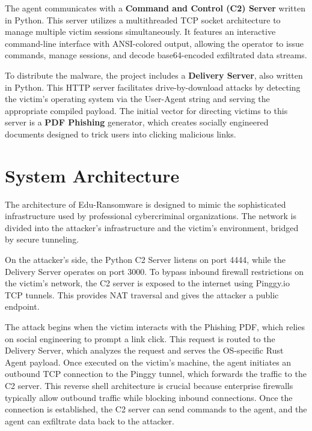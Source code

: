 \documentclass[12pt,a4paper]{article}
\begin{document}
The agent communicates with a \textbf{Command and Control (C2) Server} written in Python. This server utilizes a multithreaded TCP socket architecture to manage multiple victim sessions simultaneously. It features an interactive command-line interface with ANSI-colored output, allowing the operator to issue commands, manage sessions, and decode base64-encoded exfiltrated data streams.

To distribute the malware, the project includes a \textbf{Delivery Server}, also written in Python. This HTTP server facilitates drive-by-download attacks by detecting the victim's operating system via the User-Agent string and serving the appropriate compiled payload. The initial vector for directing victims to this server is a \textbf{PDF Phishing} generator, which creates socially engineered documents designed to trick users into clicking malicious links.

\section{System Architecture}

The architecture of Edu-Ransomware is designed to mimic the sophisticated infrastructure used by professional cybercriminal organizations. The network is divided into the attacker's infrastructure and the victim's environment, bridged by secure tunneling.

On the attacker's side, the Python C2 Server listens on port 4444, while the Delivery Server operates on port 3000. To bypass inbound firewall restrictions on the victim's network, the C2 server is exposed to the internet using Pinggy.io TCP tunnels. This provides NAT traversal and gives the attacker a public endpoint.

The attack begins when the victim interacts with the Phishing PDF, which relies on social engineering to prompt a link click. This request is routed to the Delivery Server, which analyzes the request and serves the OS-specific Rust Agent payload. Once executed on the victim's machine, the agent initiates an outbound TCP connection to the Pinggy tunnel, which forwards the traffic to the C2 server. This reverse shell architecture is crucial because enterprise firewalls typically allow outbound traffic while blocking inbound connections. Once the connection is established, the C2 server can send commands to the agent, and the agent can exfiltrate data back to the attacker.
\end{document}
